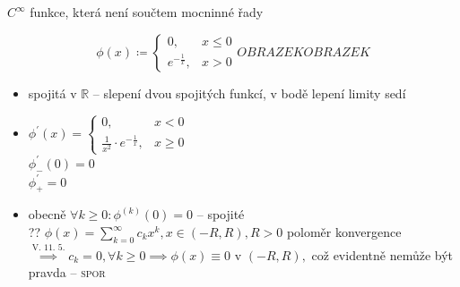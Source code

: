 \begin{priklad}
  $C^\infty$ funkce, která není součtem mocninné řady

  $$\phi (x)\coloneq \begin{cases}
    0, &x \leq 0 \\ e^{-\frac{1}{x}}, &x>0
  \end{cases} OBRAZEKOBRAZEK$$

  \begin{itemize}
    \item spojitá v $\mathbb R$ -- slepení dvou spojitých funkcí, v bodě lepení limity sedí
    \item $\phi^\prime (x) = \begin{cases}
      0, &x<0 \\ \frac{1}{x^2}\cdot e^{-\frac{1}{x}}, &x\geq 0\end{cases}$\\
      $\phi^\prime_-(0)=0$\\
      $\phi^\prime_+=0$
    \item obecně $\forall k \geq 0:\phi^{(k)}(0)=0$ -- spojité\\
    ?? $\phi(x)=\sum_{k=0}^\infty c_kx^k, x\in (-R,R), R>0$ poloměr konvergence\\
    $\stackrel{\text{V. 11. 5.}}{\implies} c_k = 0, \forall k \geq 0 \implies \phi(x)\equiv 0$ v $(-R, R),$ což evidentně nemůže být pravda -- \textsc{spor} \Lightning
  \end{itemize}
\end{priklad}
